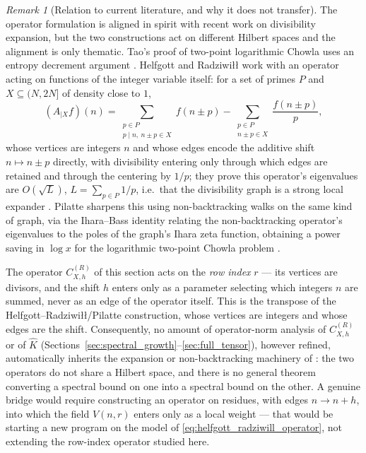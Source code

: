 \documentclass[11pt]{amsart}
\numberwithin{equation}{section}
\theoremstyle{plain}
\theoremstyle{definition}
\theoremstyle{remark}
\newtheorem{remark}[theorem]{Remark}
\begin{document}
\begin{remark}[Relation to current literature, and why it does not transfer]
\label{rem:operator_literature}
The operator formulation is aligned in spirit with recent work on divisibility expansion, but the two constructions act on different Hilbert spaces and the alignment is only thematic.  Tao's proof of two-point logarithmic Chowla uses an entropy decrement argument \cite{Tao2016}.  Helfgott and Radziwi\l{}\l{} work with an operator acting on functions of the integer variable itself: for a set of primes \(P\) and \(X\subseteq(N,2N]\) of density close to \(1\),
\begin{equation}
(A_{|X}f)(n)=\sum_{\substack{p\in P\\p\mid n,\ n\pm p\in X}}f(n\pm p)-\sum_{\substack{p\in P\\n\pm p\in X}}\frac{f(n\pm p)}p,
\label{eq:helfgott_radziwill_operator}
\end{equation}
whose vertices are integers \(n\) and whose edges encode the additive shift \(n\mapsto n\pm p\) directly, with divisibility entering only through which edges are retained and through the centering by \(1/p\); they prove this operator's eigenvalues are \(O(\sqrt L)\), \(L=\sum_{p\in P}1/p\), i.e.\ that the divisibility graph is a strong local expander \cite{HelfgottRadziwill2021}.  Pilatte sharpens this using non-backtracking walks on the same kind of graph, via the Ihara--Bass identity relating the non-backtracking operator's eigenvalues to the poles of the graph's Ihara zeta function, obtaining a power saving in \(\log x\) for the logarithmic two-point Chowla problem \cite{Pilatte2023}.

The operator \(C_{X,h}^{(R)}\) of this section acts on the \emph{row index} \(r\) — its vertices are divisors, and the shift \(h\) enters only as a parameter selecting which integers \(n\) are summed, never as an edge of the operator itself.  This is the transpose of the Helfgott--Radziwi\l{}\l{}/Pilatte construction, whose vertices are integers and whose edges are the shift.  Consequently, no amount of operator-norm analysis of \(C_{X,h}^{(R)}\) or of \(\widehat K\) (Sections~\ref{sec:spectral_growth}--\ref{sec:full_tensor}), however refined, automatically inherits the expansion or non-backtracking machinery of \cite{HelfgottRadziwill2021,Pilatte2023}: the two operators do not share a Hilbert space, and there is no general theorem converting a spectral bound on one into a spectral bound on the other.  A genuine bridge would require constructing an operator on residues, with edges \(n\to n+h\), into which the field \(V(n,r)\) enters only as a local weight — that would be starting a new program on the model of \eqref{eq:helfgott_radziwill_operator}, not extending the row-index operator studied here.
\end{remark}
\end{document}

